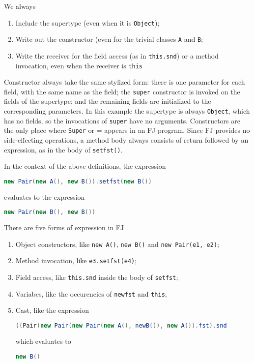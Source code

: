 We always
\begin{enumerate}
    \item Include the supertype (even when it is \texttt{Object});
    \item Write out the constructor (even for the trivial classes \texttt{A} and \texttt{B}; 
    \item Write the receiver for the field access (as in \texttt{this.snd}) or a method invocation, even when the receiver is \texttt{this}
\end{enumerate}
Constructor always take the same stylized form: there is one parameter for each
field, with the same name as the field; the \texttt{super} constructor is
invoked on the fields of the supertype; and the remaining fields are
initialized to the corresponding parameters. In this example the supertype is
always \texttt{Object}, which has no fields, so the invocations of
\texttt{super} have no arguments. Constructors are the only place where
\texttt{Super} or = appears in an FJ program. Since FJ provides no
side-effecting operations, a method body always consists of return followed by
an expression, as in the body of \texttt{setfst()}.

In the context of the above definitions, the expression
\begin{lstlisting}[language=Java]
new Pair(new A(), new B()).setfst(new B())
\end{lstlisting}
evaluates to the expression
\begin{lstlisting}[language=Java]
new Pair(new B(), new B())
\end{lstlisting}

There are five forms of expression in FJ
\begin{enumerate}
\item Object constructors, like \texttt{new A()}, \texttt{new B()} and \texttt{new Pair(e1, e2)};
\item Method invocation, like \texttt{e3.setfst(e4)};
\item Field access, like \texttt{this.snd} inside the body of \texttt{setfst};
\item Variabes, like the occurencies of \texttt{newfst} and \texttt{this};
\item Cast, like the expression %
\begin{lstlisting}[language=Java]
((Pair)new Pair(new Pair(new A(), newB()), new A()).fst).snd 
\end{lstlisting}
which evaluates to
\begin{lstlisting}[language=Java]
new B()
\end{lstlisting}
\end{enumerate} 

